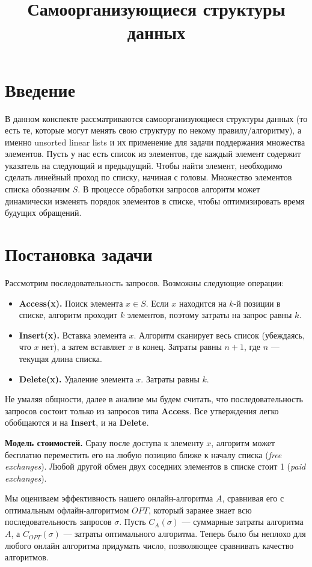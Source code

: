 \documentclass[12pt, a4paper]{article}
\title{Самоорганизующиеся структуры данных}
\date{}
\begin{document}
\maketitle

\section{Введение}
В данном конспекте рассматриваются самоорганизующиеся структуры данных (то есть те, которые могут менять свою структуру по некому правилу/алгоритму), а именно unsorted linear lists и их применение для задачи поддержания множества элементов. Пусть у нас есть список из элементов, где каждый элемент содержит указатель на следующий и предыдущий. Чтобы найти элемент, необходимо сделать линейный проход по списку, начиная с головы. Множество элементов списка обозначим $S$. В процессе обработки запросов алгоритм может динамически изменять порядок элементов в списке, чтобы оптимизировать время будущих обращений.

\section{Постановка задачи}
Рассмотрим последовательность запросов. Возможны следующие операции:
\begin{itemize}
    \item \textbf{Access(x).} Поиск элемента $x \in S$. Если $x$ находится на $k$-й позиции в списке, алгоритм проходит $k$ элементов, поэтому затраты на запрос равны $k$.
    \item \textbf{Insert(x).} Вставка элемента $x$. Алгоритм сканирует весь список (убеждаясь, что $x$ нет), а затем вставляет $x$ в конец. Затраты равны $n+1$, где $n$ --- текущая длина списка.
    \item \textbf{Delete(x).} Удаление элемента $x$. Затраты равны $k$.
\end{itemize}

Не умаляя общности, далее в анализе мы будем считать, что последовательность запросов состоит только из запросов типа \textbf{Access}. Все утверждения легко обобщаются и на \textbf{Insert}, и на \textbf{Delete}. 

\textbf{Модель стоимостей.} Сразу после доступа к элементу $x$, алгоритм может бесплатно переместить его на любую позицию ближе к началу списка (\textit{free exchanges}). Любой другой обмен двух соседних элементов в списке стоит 1 (\textit{paid exchanges}).

Мы оцениваем эффективность нашего онлайн-алгоритма $A$, сравнивая его с оптимальным офлайн-алгоритмом $OPT$, который заранее знает всю последовательность запросов $\sigma$. Пусть $C_A(\sigma)$ --- суммарные затраты алгоритма $A$, а $C_{OPT}(\sigma)$ --- затраты оптимального алгоритма. Теперь было бы неплохо для любого онлайн алгоритма придумать число, позволяющее сравнивать качество алгоритмов.
\end{document}
